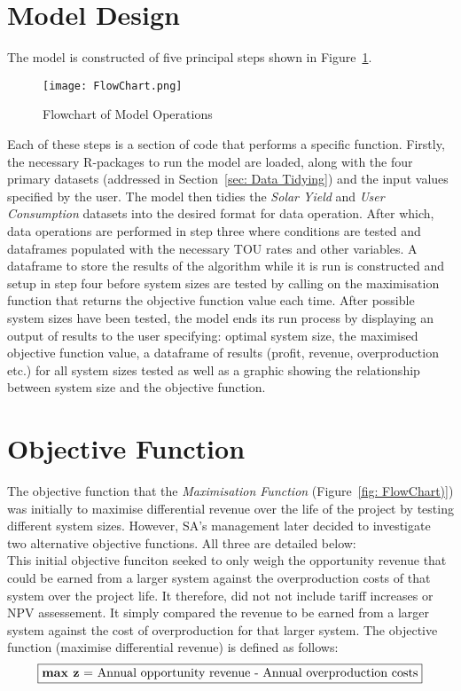 \documentclass[a4paper,11pt,fleqn]{report}
\begin{document}
\section{Model Design} \label{sec: Model Design}
The model is constructed of five principal steps shown in Figure~\ref{fig: FlowChart}.

\begin{figure}[h]
\begin{center}
\texttt{[image: FlowChart.png]}
\caption{Flowchart of Model Operations}
\label{fig: FlowChart}
\end{center}
\end{figure}

Each of these steps is a section of code that performs a specific function. Firstly, the necessary R-packages to run the model are loaded, along with the four primary datasets (addressed in Section~\ref{sec: Data Tidying}) and the input values specified by the user. The model then tidies the \textit{Solar Yield} and \textit{User Consumption} datasets into the desired format for data operation. After which, data operations are performed in step three where conditions are tested and dataframes populated with the necessary \ac{TOU} rates and other variables. A dataframe to store the results of the algorithm while it is run is constructed and setup in step four before system sizes are tested by calling on the maximisation function that returns the objective function value each time. After possible system sizes have been tested, the model ends its run process by displaying an output of results to the user specifying: optimal system size, the maximised objective function value, a dataframe of results (profit, revenue, overproduction etc.) for all system sizes tested as well as a graphic showing the relationship between system size and the objective function.

\section{Objective Function} \label{sec: Objective Function}
The objective function that the \textit{Maximisation Function} (Figure~\ref{fig: FlowChart)}) was initially to maximise differential revenue over the life of the project by testing different system sizes. However, \ac{SA}'s management later decided to investigate two alternative objective functions. All three are detailed below:\\

This initial objective funciton seeked to only weigh the opportunity revenue that could be earned from a larger system against the overproduction costs of that system over the project life. It therefore, did not not include tariff increases or \ac{NPV} assessement. It simply compared the revenue to be earned from a larger system against the cost of overproduction for that larger system. The objective function (maximise differential revenue) is defined as follows:
\begin{equation}
\boxed{$\textbf{max z} = \text{Annual opportunity revenue} - \text{Annual overproduction costs}$}\\
\end{equation}
\end{document}
